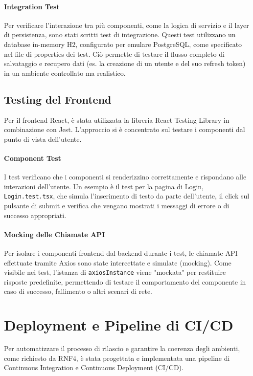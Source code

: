 \documentclass[12pt,a4paper,openright,twoside]{book}
\begin{document}

\paragraph{Integration Test} Per verificare l'interazione tra più componenti, come la logica di servizio e il layer di persistenza, sono stati scritti test di integrazione. Questi test utilizzano un database in-memory H2, configurato per emulare PostgreSQL, come specificato nel file di properties dei test. Ciò permette di testare il flusso completo di salvataggio e recupero dati (es. la creazione di un utente e del suo refresh token) in un ambiente controllato ma realistico.

\subsection{Testing del Frontend}
Per il frontend React, è stata utilizzata la libreria React Testing Library in combinazione con Jest. L'approccio si è concentrato sul testare i componenti dal punto di vista dell'utente.

\paragraph{Component Test} I test verificano che i componenti si renderizzino correttamente e rispondano alle interazioni dell'utente. Un esempio è il test per la pagina di Login, \texttt{Login.test.tsx}, che simula l'inserimento di testo da parte dell'utente, il click sul pulsante di submit e verifica che vengano mostrati i messaggi di errore o di successo appropriati.

\paragraph{Mocking delle Chiamate API} Per isolare i componenti frontend dal backend durante i test, le chiamate API effettuate tramite Axios sono state intercettate e simulate (mocking). Come visibile nei test, l'istanza di \texttt{axiosInstance} viene "mockata" per restituire risposte predefinite, permettendo di testare il comportamento del componente in caso di successo, fallimento o altri scenari di rete.

\section{Deployment e Pipeline di CI/CD}
\label{sec:ci_cd}
Per automatizzare il processo di rilascio e garantire la coerenza degli ambienti, come richiesto da RNF4, è stata progettata e implementata una pipeline di Continuous Integration e Continuous Deployment (CI/CD).
\end{document}
